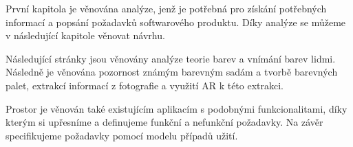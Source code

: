 \begin{chapterabstract}
První kapitola je věnována analýze, jenž je potřebná pro získání potřebných informací
a popsání požadavků softwarového produktu. Díky analýze se můžeme v následující kapitole
věnovat návrhu.

Následující stránky jsou věnovány analýze teorie barev a vnímání barev lidmi. Následně
je věnována pozornost známým barevným sadám a tvorbě barevných palet, extrakcí informací z fotografie
a využití AR k této extrakci. 

Prostor je věnován také existujícím aplikacím s podobnými funkcionalitami, díky kterým si upřesníme a definujeme
funkční a nefunkční požadavky. Na závěr specifikujeme požadavky pomocí modelu případů užití.
\end{chapterabstract}






